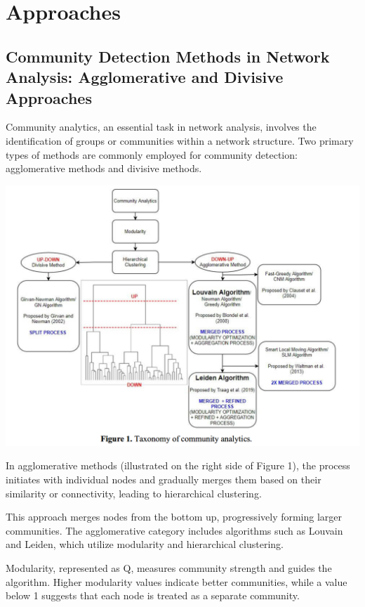 \section{Approaches}

\subsection{Community Detection Methods in Network Analysis: Agglomerative and Divisive Approaches}
Community analytics, an essential task in network analysis, involves the identification of groups or communities within a network structure. Two primary types of methods are commonly employed for community detection: agglomerative methods and divisive methods.
\begin{center}
    \includegraphics[scale=0.45]{image/jpcsj.png}
\end{center}
In agglomerative methods (illustrated on the right side of Figure 1), the process initiates with individual nodes and gradually merges them based on their similarity or connectivity, leading to hierarchical clustering. 

This approach merges nodes from the bottom up, progressively forming larger communities. The agglomerative category includes algorithms such as Louvain and Leiden, which utilize modularity and hierarchical clustering. 

Modularity, represented as Q, measures community strength and guides the algorithm. Higher modularity values indicate better communities, while a value below 1 suggests that each node is treated as a separate community. 

